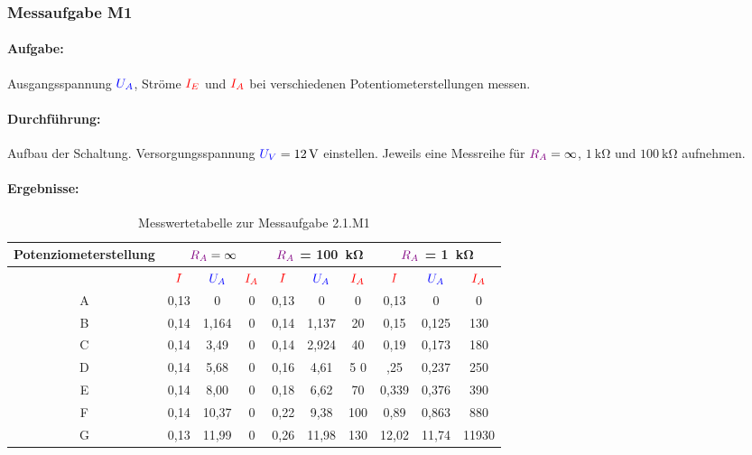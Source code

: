 \documentclass[11pt,a4paper,titlepage]{scrreprt}
\begin{document}
        \subsubsection{Messaufgabe M1}
          \paragraph{Aufgabe:} Ausgangsspannung $\textcolor{blue}{U_A}$, Ströme $\textcolor{red}{I_E}$ und $\textcolor{red}{I_A}$ bei verschiedenen Potentiometerstellungen
          messen.
          \paragraph{Durchführung:}Aufbau der Schaltung. Versorgungsspannung $\textcolor{blue}{U_V} = \SI{12}{\volt}$ einstellen. Jeweils eine
          Messreihe für $\textcolor{violet}{R_A} = \infty$, $\SI{1}{\kilo\ohm}$ und $\SI{100}{\kilo\ohm}$ aufnehmen.
          \paragraph{Ergebnisse:}
            \begin{center}
              \begin{table}[!hbtp]
                \caption{Messwertetabelle zur Messaufgabe 2.1.M1}
                \label{tbl:messergebnisse1.1}
                \renewcommand{\arraystretch}{1.3}
                \begin{tabular}{c|ccc|ccc|ccc}
                  Potenziometerstellung & \multicolumn{3}{c}{\textbf{$\textcolor{violet}{R_A} = \infty$}} & \multicolumn{3}{c}{\textbf{$\textcolor{violet}{R_A}$ = \SI{100}{\kilo\ohm}}}& \multicolumn{3}{c}{\textbf{$\textcolor{violet}{R_A}$ = \SI{1}{\kilo\ohm}}}\\ \hline
                                & $\textcolor{red}{I}$ & $\textcolor{blue}{U_A}$ & $\textcolor{red}{I_A}$ & $\textcolor{red}{I}$ & $\textcolor{blue}{U_A}$ & $\textcolor{red}{I_A}$ & $\textcolor{red}{I}$ & $\textcolor{blue}{U_A}$ & $\textcolor{red}{I_A}$\\
                                A & 0,13 & 0 & 0 & 0,13 & 0 & 0 & 0,13 & 0 & 0\\
                                B & 0,14 & 1,164 & 0 & 0,14 & 1,137 & 20 & 0,15 & 0,125 & 130\\
                                C & 0,14 & 3,49 & 0 & 0,14 & 2,924 & 40 & 0,19 & 0,173 & 180\\
                                D & 0,14 & 5,68 & 0 & 0,16 & 4,61 &5 0 & ,25 & 0,237 & 250\\
                                E & 0,14 & 8,00 & 0 & 0,18 & 6,62 & 70 & 0,339 & 0,376 & 390\\
                                F & 0,14 & 10,37 & 0 & 0,22 & 9,38 & 100 & 0,89 & 0,863 & 880\\
                                G & 0,13 & 11,99 & 0 & 0,26 & 11,98 & 130 & 12,02 & 11,74 & 11930\\
                \end{tabular}
              \end{table}
            \end{center}
\end{document}

